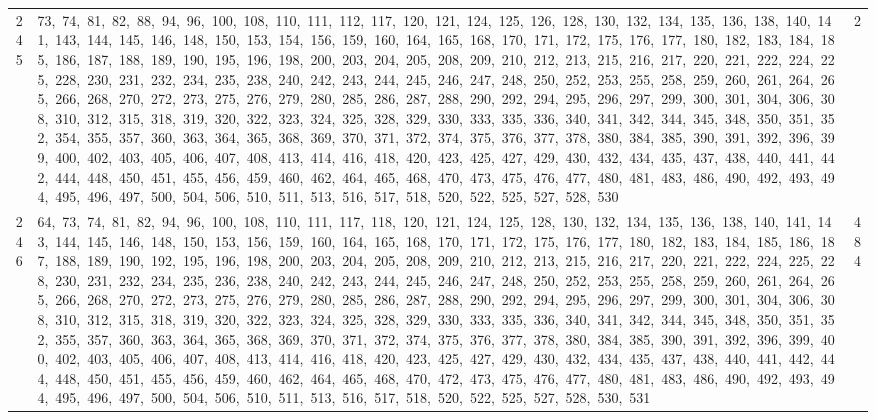\begin{longtable}{c|p{}|r}
245 & 73,\ 74,\ 81,\ 82,\ 88,\ 94,\ 96,\ 100,\ 108,\ 110,\ 111,\ 112,\ 117,\ 120,\ 121,\ 124,\ 125,\ 126,\ 128,\ 130,\ 132,\ 134,\ 135,\ 136,\ 138,\ 140,\ 141,\ 143,\ 144,\ 145,\ 146,\ 148,\ 150,\ 153,\ 154,\ 156,\ 159,\ 160,\ 164,\ 165,\ 168,\ 170,\ 171,\ 172,\ 175,\ 176,\ 177,\ 180,\ 182,\ 183,\ 184,\ 185,\ 186,\ 187,\ 188,\ 189,\ 190,\ 195,\ 196,\ 198,\ 200,\ 203,\ 204,\ 205,\ 208,\ 209,\ 210,\ 212,\ 213,\ 215,\ 216,\ 217,\ 220,\ 221,\ 222,\ 224,\ 225,\ 228,\ 230,\ 231,\ 232,\ 234,\ 235,\ 238,\ 240,\ 242,\ 243,\ 244,\ 245,\ 246,\ 247,\ 248,\ 250,\ 252,\ 253,\ 255,\ 258,\ 259,\ 260,\ 261,\ 264,\ 265,\ 266,\ 268,\ 270,\ 272,\ 273,\ 275,\ 276,\ 279,\ 280,\ 285,\ 286,\ 287,\ 288,\ 290,\ 292,\ 294,\ 295,\ 296,\ 297,\ 299,\ 300,\ 301,\ 304,\ 306,\ 308,\ 310,\ 312,\ 315,\ 318,\ 319,\ 320,\ 322,\ 323,\ 324,\ 325,\ 328,\ 329,\ 330,\ 333,\ 335,\ 336,\ 340,\ 341,\ 342,\ 344,\ 345,\ 348,\ 350,\ 351,\ 352,\ 354,\ 355,\ 357,\ 360,\ 363,\ 364,\ 365,\ 368,\ 369,\ 370,\ 371,\ 372,\ 374,\ 375,\ 376,\ 377,\ 378,\ 380,\ 384,\ 385,\ 390,\ 391,\ 392,\ 396,\ 399,\ 400,\ 402,\ 403,\ 405,\ 406,\ 407,\ 408,\ 413,\ 414,\ 416,\ 418,\ 420,\ 423,\ 425,\ 427,\ 429,\ 430,\ 432,\ 434,\ 435,\ 437,\ 438,\ 440,\ 441,\ 442,\ 444,\ 448,\ 450,\ 451,\ 455,\ 456,\ 459,\ 460,\ 462,\ 464,\ 465,\ 468,\ 470,\ 473,\ 475,\ 476,\ 477,\ 480,\ 481,\ 483,\ 486,\ 490,\ 492,\ 493,\ 494,\ 495,\ 496,\ 497,\ 500,\ 504,\ 506,\ 510,\ 511,\ 513,\ 516,\ 517,\ 518,\ 520,\ 522,\ 525,\ 527,\ 528,\ 530 & 2 \\
246 & 64,\ 73,\ 74,\ 81,\ 82,\ 94,\ 96,\ 100,\ 108,\ 110,\ 111,\ 117,\ 118,\ 120,\ 121,\ 124,\ 125,\ 128,\ 130,\ 132,\ 134,\ 135,\ 136,\ 138,\ 140,\ 141,\ 143,\ 144,\ 145,\ 146,\ 148,\ 150,\ 153,\ 156,\ 159,\ 160,\ 164,\ 165,\ 168,\ 170,\ 171,\ 172,\ 175,\ 176,\ 177,\ 180,\ 182,\ 183,\ 184,\ 185,\ 186,\ 187,\ 188,\ 189,\ 190,\ 192,\ 195,\ 196,\ 198,\ 200,\ 203,\ 204,\ 205,\ 208,\ 209,\ 210,\ 212,\ 213,\ 215,\ 216,\ 217,\ 220,\ 221,\ 222,\ 224,\ 225,\ 228,\ 230,\ 231,\ 232,\ 234,\ 235,\ 236,\ 238,\ 240,\ 242,\ 243,\ 244,\ 245,\ 246,\ 247,\ 248,\ 250,\ 252,\ 253,\ 255,\ 258,\ 259,\ 260,\ 261,\ 264,\ 265,\ 266,\ 268,\ 270,\ 272,\ 273,\ 275,\ 276,\ 279,\ 280,\ 285,\ 286,\ 287,\ 288,\ 290,\ 292,\ 294,\ 295,\ 296,\ 297,\ 299,\ 300,\ 301,\ 304,\ 306,\ 308,\ 310,\ 312,\ 315,\ 318,\ 319,\ 320,\ 322,\ 323,\ 324,\ 325,\ 328,\ 329,\ 330,\ 333,\ 335,\ 336,\ 340,\ 341,\ 342,\ 344,\ 345,\ 348,\ 350,\ 351,\ 352,\ 355,\ 357,\ 360,\ 363,\ 364,\ 365,\ 368,\ 369,\ 370,\ 371,\ 372,\ 374,\ 375,\ 376,\ 377,\ 378,\ 380,\ 384,\ 385,\ 390,\ 391,\ 392,\ 396,\ 399,\ 400,\ 402,\ 403,\ 405,\ 406,\ 407,\ 408,\ 413,\ 414,\ 416,\ 418,\ 420,\ 423,\ 425,\ 427,\ 429,\ 430,\ 432,\ 434,\ 435,\ 437,\ 438,\ 440,\ 441,\ 442,\ 444,\ 448,\ 450,\ 451,\ 455,\ 456,\ 459,\ 460,\ 462,\ 464,\ 465,\ 468,\ 470,\ 472,\ 473,\ 475,\ 476,\ 477,\ 480,\ 481,\ 483,\ 486,\ 490,\ 492,\ 493,\ 494,\ 495,\ 496,\ 497,\ 500,\ 504,\ 506,\ 510,\ 511,\ 513,\ 516,\ 517,\ 518,\ 520,\ 522,\ 525,\ 527,\ 528,\ 530,\ 531 & 484 \\

\end{longtable}
